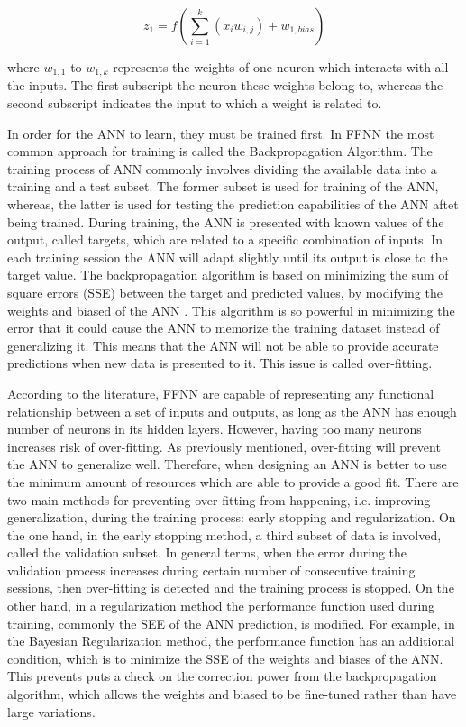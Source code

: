 \begin{equation}
    z_1 = f \left( \sum_{i=1}^k(x_i w_{i,j}) + w_{1,bias} \right)
\label{c6_neuronout}
\end{equation}

\noindent where $w_{1,1}$ to $w_{1,k}$ represents the weights of one neuron which interacts with all the inputs. The first subscript the neuron these weights belong to, whereas the second subscript indicates the input to which a weight is related to. 

In order for the ANN to learn, they must be trained first. In FFNN the most common approach for training is called the Backpropagation Algorithm. The training process of ANN commonly involves dividing the available data into a training and a test subset. The former subset is used for training of the ANN, whereas, the latter is used for testing the prediction capabilities of the ANN aftet being trained. During training, the ANN is presented with known values of the output, called targets, which are related to a specific combination of inputs. In each training session the ANN will adapt slightly until its output is close to the target value. The backpropagation algorithm is based on minimizing the sum of square errors (SSE) between the target and predicted values, by modifying the weights and biased of the ANN \cite{zhang2003artificial}. This algorithm is so powerful in minimizing the error that it could cause the ANN to memorize the training dataset instead of generalizing it. This means that the ANN will not be able to provide accurate predictions when new data is presented to it. This issue is called over-fitting.

According to the literature, FFNN are capable of representing any functional relationship between a set of inputs and outputs, as long as the ANN has enough number of neurons in its hidden layers. However, having too many neurons increases risk of over-fitting. As previously mentioned, over-fitting will prevent the ANN to generalize well. Therefore, when designing an ANN is better to use the minimum amount of resources which are able to provide a good fit. There are two main methods for preventing over-fitting from happening, i.e. improving generalization, during the training process: early stopping and regularization. On the one hand, in the early stopping method, a third subset of data is involved, called the validation subset. In general terms, when the error during the validation process increases during certain number of consecutive training sessions, then over-fitting is detected and the training process is stopped. On the other hand, in a regularization method the performance function used during training, commonly the SEE of the ANN prediction, is modified. For example, in the Bayesian Regularization method, the performance function has an additional condition, which is to minimize the SSE of the weights and biases of the ANN. This prevents puts a check on the correction power from the backpropagation algorithm, which allows the weights and biased to be fine-tuned rather than have large variations. 

